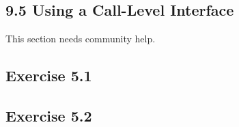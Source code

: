 \documentclass[../../main.tex]{subfiles}
\begin{document}
\subsection{9.5 Using a Call-Level Interface}

This section needs community help.

\subsection*{Exercise 5.1}

\subsection*{Exercise 5.2}
\end{document}
